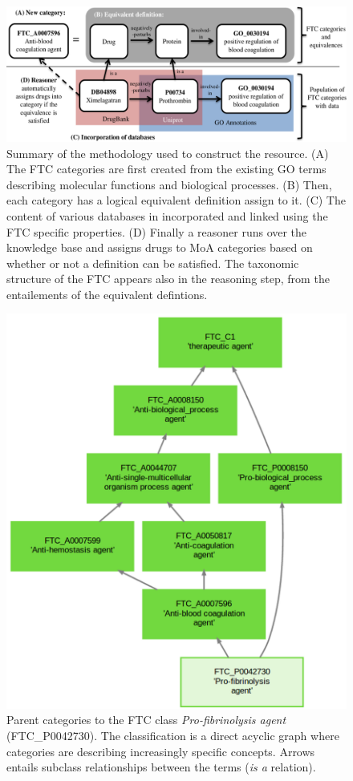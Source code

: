 \documentclass{bioinfo}
\begin{document}
\begin{figure}[!tpb]%
\centerline{\includegraphics{fig1.png}}
\caption{Summary of the methodology used to construct the resource. (A) The FTC categories are first created from the existing GO terms
describing molecular functions and biological processes. (B) Then, each category has a logical equivalent definition assign to it.
(C) The content of various databases in incorporated and linked using the FTC specific properties. (D) Finally a reasoner runs over the knowledge
base and assigns drugs to MoA categories based on whether or not a definition can be satisfied. The taxonomic structure of the
FTC appears also in the reasoning step, from the entailements of the equivalent defintions.}\label{fig:01}
\end{figure}

\begin{figure}[!tpb]%
\centerline{\includegraphics{fig2.png}}
\caption{Parent categories to the FTC class \emph{Pro-fibrinolysis agent} (FTC\_P0042730). The classification is a direct 
acyclic graph where categories are describing increasingly specific concepts. Arrows entails subclass relationships 
between the terms (\emph{is a} relation).}\label{fig:02}
\end{figure}
\end{document}
